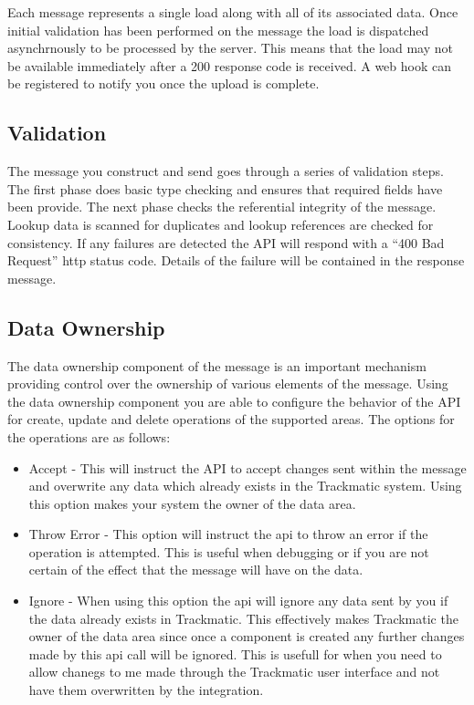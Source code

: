 \documentclass[letterpaper,10pt,english]{sphinxmanual}
\begin{document}
Each message represents a single load along with all of its associated data. Once initial validation has been performed on the message the load is dispatched asynchrnously to be processed by the server. This means that the load may not be available immediately after a 200 response code is received. A web hook can be registered to notify you once the upload is complete.


\subsection{Validation}
\label{\detokenize{loads/integration/import:validation}}
The message you construct and send goes through a series of validation steps. The first phase does basic type checking and ensures that required fields have been provide. The next phase checks the referential integrity of the message. Lookup data is scanned for duplicates and lookup references are checked for consistency. If any failures are detected the API will respond with a ``400 Bad Request'' http status code. Details of the failure will be contained in the response message.


\subsection{Data Ownership}
\label{\detokenize{loads/integration/import:data-ownership}}
The data ownership component of the message is an important mechanism providing control over the ownership of various elements of the message. Using the data ownership component you are able to configure the behavior of the API for create, update and delete operations of the supported areas. The options for the operations are as follows:
\begin{itemize}
\item {} 
Accept - This will instruct the API to accept changes sent within the message and overwrite any data which already exists in the Trackmatic system. Using this option makes your system the owner of the data area.

\item {} 
Throw Error - This option will instruct the api to throw an error if the operation is attempted. This is useful when debugging or if you are not certain of the effect that the message will have on the data.

\item {} 
Ignore - When using this option the api will ignore any data sent by you if the data already exists in Trackmatic. This effectively makes Trackmatic the owner of the data area since once a component is created any further changes made by this api call will be ignored. This is usefull for when you need to allow chanegs to me made through the Trackmatic user interface and not have them overwritten by the integration.

\end{itemize}
\end{document}
